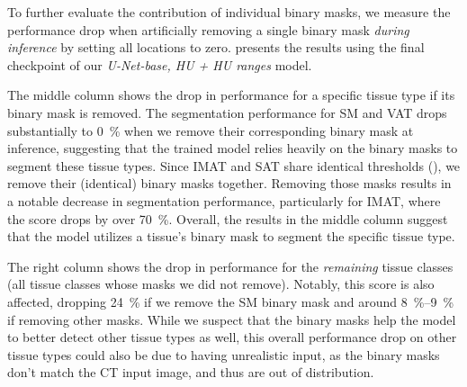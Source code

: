 \documentclass[conference]{IEEEtran}
\begin{document}
To further evaluate the contribution of individual binary masks, we measure the performance drop when artificially removing a single binary mask \emph{during inference} by setting all locations to zero. 
 presents the results using the final checkpoint of our \emph{U-Net-base, HU + HU ranges} model.

The middle column shows the drop in performance for a specific tissue type if its binary mask is removed.
The segmentation performance for SM and VAT drops substantially to \SI{0}{\percent} when we remove their corresponding binary mask at inference, suggesting that the trained model relies heavily on the binary masks to segment these tissue types.
Since IMAT and SAT share identical thresholds (), we remove their (identical) binary masks together.
Removing those masks results in a notable decrease in segmentation performance, particularly for IMAT, where the score drops by over \SI{70}{\percent}.
Overall, the results in the middle column suggest that the model utilizes a tissue's binary mask to segment the specific tissue type.

The right column shows the drop in performance for the \emph{remaining} tissue classes (all tissue classes whose masks we did not remove).
Notably, this score is also affected, dropping \SI{24}{\percent} if we remove the SM binary mask and around \SIrange{8}{9}{\percent} if removing other masks.
While we suspect that the binary masks help the model to better detect other tissue types as well,
this overall performance drop on other tissue types could also be due to having unrealistic input, as the binary masks don't match the CT input image, and thus are out of distribution.
\end{document}
